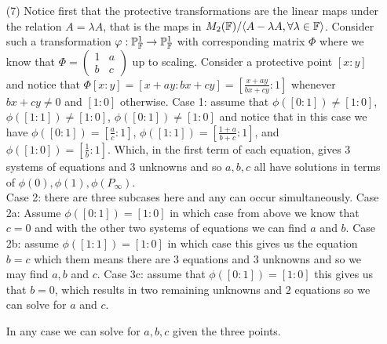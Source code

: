 \documentclass[12pt]{amsart}
\newcommand{\PPt}{\mathbb{P}}
\let\P\PPt
\begin{document}
\begin{itemize}
\item[(7)] %
Notice first that the protective transformations are the linear maps under the relation $A=\lambda A$, that is the maps in $M_2(\mathbb{F})/\langle A-\lambda A, \forall \lambda\in\mathbb{F}\rangle$. Consider such a transformation $\phi:\P_\F^1\ra\P_\F^1$ with corresponding matrix $\Phi$ where we know that $\Phi=\begin{pmatrix}1& a\\ b & c\end{pmatrix}$ up to scaling. Consider a protective point $[x:y]$ and notice that $\Phi[x:y]=[x+ay:bx+cy]=[\frac{x+ay}{bx+cy}:1]$ whenever $bx+cy\neq 0$ and $[1:0]$ otherwise. Case 1: assume that $\phi([0:1])\neq [1:0]$, $\phi([1:1])\neq [1:0]$, $\phi([0:1])\neq [1:0]$ and notice that in this case we have 
$\phi([0:1])=[\frac{a}{c}:1]$,
$\phi([1:1])=[\frac{1+a}{b+c}:1]$, and $\phi([1:0])=[\frac{1}{b}:1]$. Which, in the first term of each equation, gives $3$ systems of equations and $3$ unknowns and so $a,b,c$ all have solutions in terms of $\phi(0),\phi(1),\phi(P_\infty)$.\\
Case 2: there are three subcases here and any can occur simultaneously. Case 2a: Assume $\phi([0:1])= [1:0]$ in which case from above we know that $c=0$ and with the other two systems of equations we can find $a$ and $b$. Case 2b: assume $\phi([1:1])= [1:0]$ in which case this gives us the equation $b=c$ which them means there are $3$ equations and $3$ unknowns and so we may find $a,b$ and $c$. Case 3c: assume that $\phi([0:1])= [1:0]$ this gives us that $b=0$, which results in two remaining unknowns and $2$ equations so we can solve for $a$ and $c$.

In any case we can solve for $a,b,c$ given the three points.
\end{itemize}
\end{document}
